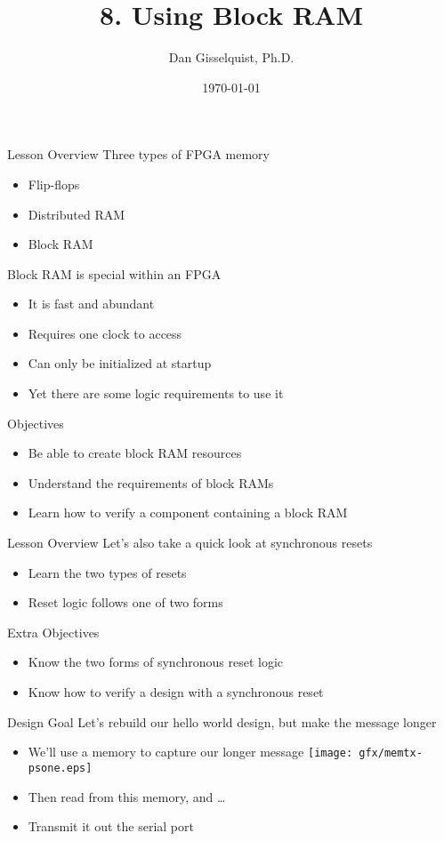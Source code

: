 \documentclass[style=gt,mode=present,paper=screen]{powerdot}
\title{8. Using Block RAM}
\author{Dan Gisselquist, Ph.D.}
\date{\today}
\begin{document}
%
%
\begin{slide}{Lesson Overview}
Three types of FPGA memory
\begin{itemize}
\item Flip-flops
\item Distributed RAM
\item Block RAM
\end{itemize}
Block RAM is special within an FPGA
\begin{itemize}
\item It is fast and abundant
\item Requires one clock to access
\item Can only be initialized at startup
\item Yet there are some logic requirements to use it
\end{itemize}

Objectives
\begin{itemize}
\item Be able to create block RAM resources
\item Understand the requirements of block RAMs
\item Learn how to verify a component containing a block RAM
\end{itemize}
\end{slide}
%
%
\begin{slide}[bm=,toc=,method=direct]{Lesson Overview}
Let's also take a quick look at synchronous resets
\begin{itemize}
\item Learn the two types of resets
\item Reset logic follows one of two forms
\end{itemize}

Extra Objectives
\begin{itemize}
\item Know the two forms of synchronous reset logic
\item Know how to verify a design with a synchronous reset
\end{itemize}
\end{slide}
%
%
%
\begin{slide}[method=direct]{Design Goal}
Let's rebuild our hello world design, but make the message longer
\begin{itemize}
\item We'll use a memory to capture our longer message
\texttt{[image: gfx/memtx-psone.eps]}
\item Then read from this memory, and \ldots
\item Transmit it out the serial port
\end{itemize}
\end{slide}
\end{document}
